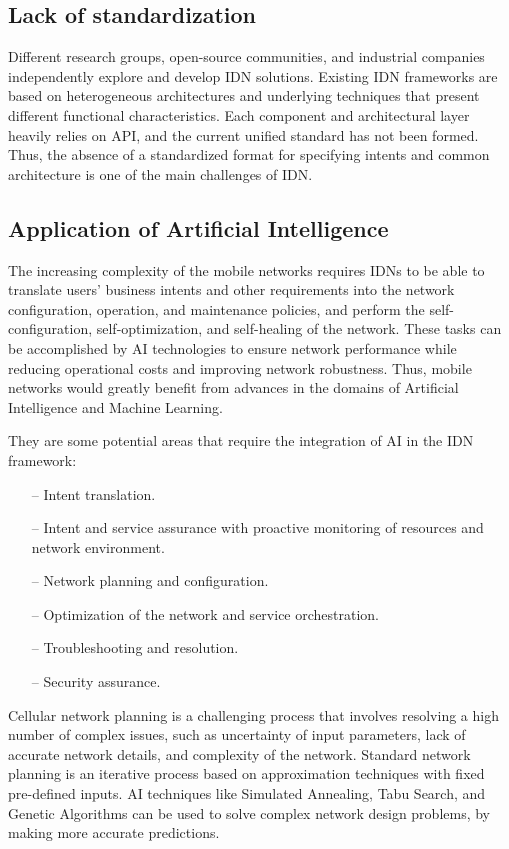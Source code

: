 \subsection{Lack of standardization}
Different research groups, open-source communities, and industrial companies independently explore and develop IDN solutions. Existing IDN frameworks are based on heterogeneous architectures and underlying techniques that present different functional characteristics. Each component and architectural layer heavily relies on API, and the current unified standard has not been formed. Thus, the absence of a standardized format for specifying intents and common architecture is one of the main challenges of IDN. \cite{8968429}

\subsection{Application of Artificial Intelligence}
The increasing complexity of the mobile networks requires IDNs to be able to translate users' business intents and other requirements into the network configuration, operation, and maintenance policies, and perform the self-configuration, self-optimization, and self-healing of the network. These tasks can be accomplished by AI technologies to ensure network performance while reducing operational costs and improving network robustness. Thus, mobile networks would greatly benefit from advances in the domains of Artificial Intelligence and Machine Learning. \cite{Wei2020}

They are some potential areas that require the integration of AI in the IDN framework:
\begin{itemize}
\item[--] Intent translation.
\item[--] Intent and service assurance with proactive monitoring of resources and network environment.
\item[--] Network planning and configuration.
\item[--] Optimization of the network and service orchestration.
\item[--] Troubleshooting and resolution.
\item[--] Security assurance.
\end{itemize}

Cellular network planning is a challenging process that involves resolving a high number of complex issues, such as uncertainty of input parameters, lack of accurate network details, and complexity of the network. Standard network planning is an iterative process based on approximation techniques with fixed pre-defined inputs. AI techniques like Simulated Annealing, Tabu Search, and Genetic Algorithms can be used to solve complex network design problems, by making more accurate predictions. \cite{anuradha2017empowering}

